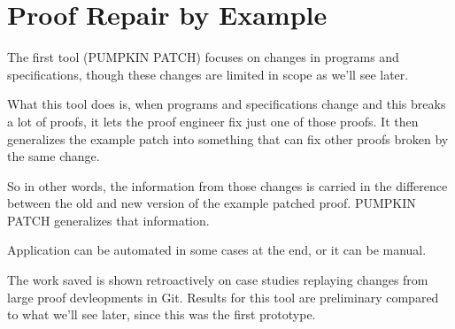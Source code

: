 \chapter{Proof Repair by Example}
\label{ch:example}

The first tool (PUMPKIN PATCH) focuses on changes in programs and specifications, though these changes are limited in scope as we'll see later.

What this tool does is, when programs and specifications change and this breaks a lot of proofs, it lets the proof engineer fix just one of those proofs. It then generalizes the example patch into something that can fix other proofs broken by the same change.

So in other words, the information from those changes is carried in the difference between the old and new version of the example patched proof.
PUMPKIN PATCH generalizes that information.

Application can be automated in some cases at the end, or it can be manual.

The work saved is shown retroactively on case studies replaying changes from large proof devleopments in Git. Results for this tool are preliminary compared to what we'll see later, since this was the first prototype.
















